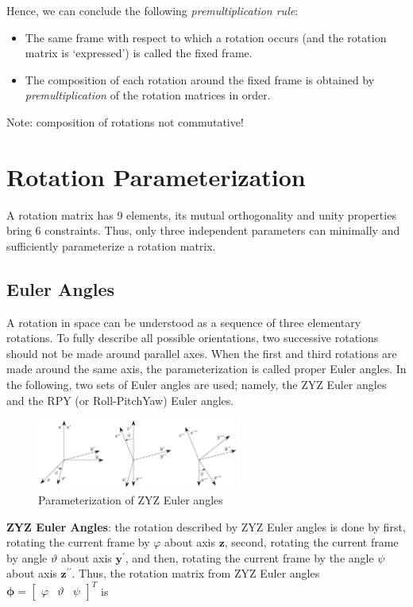 \documentclass[10pt]{article}
\begin{document}
Hence, we can conclude the following \emph{premultiplication rule}:

\begin{itemize}
    \item The same frame with respect to which a rotation occurs (and the rotation matrix is `expressed') is called the fixed frame.
    \item The composition of each  rotation around  the fixed frame is  obtained by \emph{premultiplication} of the rotation matrices in  order.
\end{itemize}



Note: composition of rotations not commutative!


\section{Rotation Parameterization}
A rotation matrix has 9 elements, its mutual orthogonality and unity properties bring 6 constraints. Thus, 
only three independent parameters can minimally and sufficiently parameterize a rotation matrix.




\subsection{Euler Angles}


A rotation in space can be understood as a sequence of three elementary rotations. To fully describe all possible orientations, two successive rotations should not be made around parallel axes. When the first and third rotations are made around the same axis, the parameterization is called proper Euler angles. 
In the following, two sets of Euler angles are used; namely, the ZYZ Euler angles and the RPY (or Roll-PitchYaw) Euler angles.

\begin{figure}[h]
    \centering
    \includegraphics[max width=0.6\textwidth]{./kinematics/zyz_euler_angles}
    \caption{Parameterization of ZYZ Euler angles }
    \label{c1.fig.euler_angle_zyz}
\end{figure}


\bigskip
\noindent
\textbf{ZYZ Euler Angles}: the rotation described by ZYZ Euler angles is done by first,  rotating the current frame by  $\varphi$ about axis $\boldsymbol{z}$, second, rotating the current frame by  angle $\vartheta$ about axis $\boldsymbol{y}^{\prime}$, and then, rotating the current frame by the angle $\psi$ about axis $\boldsymbol{z}^{\prime\prime}$. Thus, 
the  rotation matrix from ZYZ Euler angles $\boldsymbol{\phi}=\left[\begin{array}{lll}\varphi & \vartheta & \psi\end{array}\right]^{T}$ is
\end{document}
